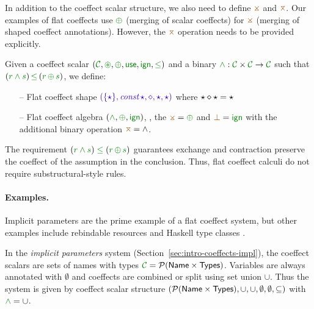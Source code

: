 In addition to the coeffect scalar structure, we also need to define $\apar$ and $\azip$.
Our examples of flat coeffects use $\cpar$ (merging of scalar coeffects) for $\apar$ (merging of shaped 
coeffect annotations). However, the $\azip$ operation needs to be provided explicitly.

\begin{definition}
Given a coeffect scalar $(\C, \cseq, \cpar, \cunit, \czero, \cleq)$ and a binary 
$\cclrd{\wedge} : \C \times \C \rightarrow \C$ such that $(\cclrd{r \wedge s}) \,\cleq\, (\cclrd{r}\,\cpar\,\cclrd{s})$, we define:
\begin{itemize}{}
\item[--] Flat coeffect shape $\sclrd{(\{ \sflat \}, \emph{const} \, \sflat, \diamond, \sflat, \sflat)}$ where 
  $\star \diamond \star = \star$
\item[--] Flat coeffect algebra $(\cclrd{\wedge}, \cpar, \czero)$, \ie{}, the $\apar = \cpar$ and $\azero = 
\czero$ with the additional binary operation $\azip = \wedge$. 
\end{itemize}
\end{definition}

\noindent
The requirement $(\cclrd{r \wedge s}) \;\cleq\; (\cclrd{r}\,\cpar\,\cclrd{s})$ guarantees 
exchange and contraction preserve the coeffect of the assumption in the conclusion. Thus, flat coeffect
calculi do not require substructural-style rules.
 
\paragraph{Examples.}
Implicit parameters are the prime example of a flat coeffect system, but other examples
include rebindable resources \cite{app-distributed-acute} and Haskell type classes \cite{orchard2013thesis}.

In the \emph{implicit parameters} system (Section~\ref{sec:intro-coeffects-impl}), 
the co\-effect scalars are sets of names with types 
$\C = \mathcal{P}(\ident{Name} \times \ident{Types}) $. Variables
are always annotated with $\emptyset$ and coeffects are combined or split using set union $\cup$. Thus
the system is given by coeffect scalar structure $(\mathcal{P}(\textnormal{\sffamily Name} \times \textnormal{\sffamily Types}), \cup, \cup, \emptyset, \emptyset, \subseteq)$
with $\cclrd{\wedge} = \cup$.

